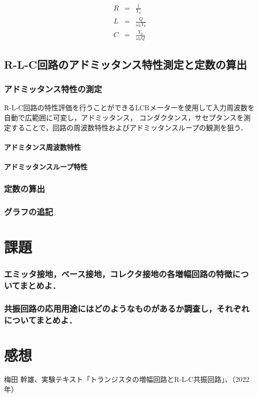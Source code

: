 \documentclass[dvipdfmx,titlepage,a4j]{jsarticle}  %
\numberwithin{equation}{section}
\begin{document}
\begin{eqnarray}
  R &=& \frac{1}{Y_0} \\
  L &=& \frac{Q}{\omega_0 Y_0} \\
  C &=& \frac{Y_0}{\omega_0 Q}
\end{eqnarray}

\subsection{R-L-C回路のアドミッタンス特性測定と定数の算出}

\subsubsection{アドミッタンス特性の測定}
R-L-C回路の特性評価を行うことができるLCRメーターを使用して入力周波数を自動で広範囲に可変し，アドミッタンス，
コンダクタンス，サセプタンスを測定することで，回路の周波数特性およびアドミッタンスループの観測を狙う．

\paragraph{アドミタンス周波数特性}

\paragraph{アドミッタンスループ特性}

\subsubsection{定数の算出}

\subsubsection{グラフの追記}

\section{課題}

\subsubsection{エミッタ接地，ベース接地，コレクタ接地の各増幅回路の特徴についてまとめよ．}

\subsubsection{共振回路の応用用途にはどのようなものがあるか調査し，それぞれについてまとめよ．}

\section{感想}

\begin{thebibliography}{99}
   梅田 幹雄、実験テキスト「トランジスタの増幅回路とR-L-C共振回路」、（2022年）
\end{thebibliography}
\end{document}
